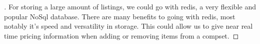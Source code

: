 \documentclass[]{article}
\theoremstyle{definition}
\begin{document}
\begin{enumerate}
\begin{proof}[\unskip\nopunct]
For storing a large amount of listings, we could go with redis, a very flexible and popular NoSql database. There are many benefits to going with redis, most notably it's speed and versatility in storage. This could allow us to give near real time pricing information when adding or removing items from a compset.

\end{proof}


\end{enumerate}
\end{document}
